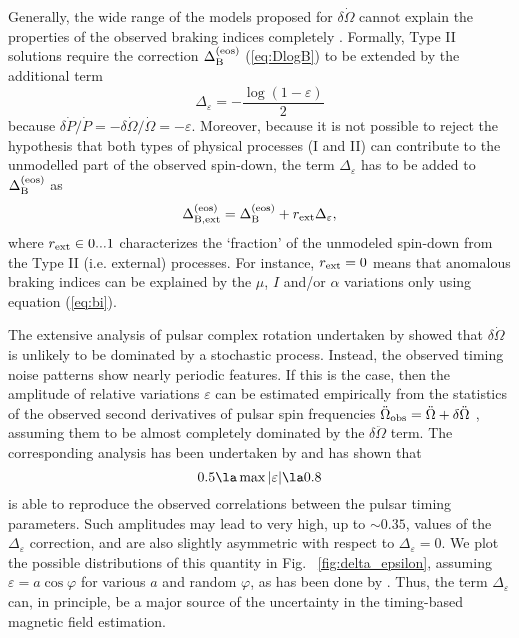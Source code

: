 \documentclass[fleqn,usenatbib]{mnras}
\begin{document}
Generally, the wide range of the models proposed for $\delta\dot\Omega$ cannot
explain the properties of the observed braking indices completely
 \citep{malov16}. Formally, Type II solutions require the correction
$\Delta^{\rm (eos)}_{\rm B}$ (\ref{eq:DlogB}) to be extended by the additional term
\begin{equation}
	\Delta_{\varepsilon} = -\dfrac{\log(1 - \varepsilon)}{2}
	\label{eq:delta_eps}
\end{equation}
because $\delta \dot P/\dot P = -\delta \dot \Omega/\dot \Omega = -\varepsilon$. 
Moreover, because it is not possible to reject the hypothesis that both types of physical processes
(I and II) can contribute to the unmodelled part of the observed
spin-down, the term $\Delta_{\varepsilon}$ has to be added to $\Delta^{\rm (eos)}_{\rm B}$ as
\begin{equation}
	\Delta^{\rm (eos)}_{\rm B,ext} = \Delta^{\rm (eos)}_{\rm B} + r_{\rm ext}\Delta_{\varepsilon},
	\label{eq:logBext}
\end{equation}
where $r_{\rm ext} \in 0...1$ characterizes the `fraction' of the unmodeled spin-down from the Type II (i.e. external)
processes.  For instance, $r_{\rm ext} = 0$ means that anomalous braking indices can be explained by the $\mu$, $I$ and/or $\alpha$
variations only using equation (\ref{eq:bi}).

The extensive analysis of pulsar complex rotation undertaken by
\cite{hobbs10} showed that $\delta\dot\Omega$ is unlikely to be dominated by a
stochastic process. Instead, the observed timing noise patterns show
nearly periodic features. If this is the case, then the amplitude of
relative variations $\varepsilon$ can be estimated empirically from the statistics
of the observed second derivatives of pulsar spin frequencies $\ddot \Omega_{\rm obs} = \ddot \Omega + \delta \ddot \Omega$ , assuming them to be almost completely dominated by
the $\delta\ddot\Omega$ term. The corresponding analysis has been undertaken by
\cite{bbk12} and has shown that
\begin{equation}
	0.5 \la \max \vert \varepsilon \vert \la 0.8
	\label{eq:epsilon_constr}
\end{equation}
is able to reproduce the observed correlations between the pulsar timing parameters. Such amplitudes may lead to very high, up
to $\sim 0.35$, values of the $\Delta_{\varepsilon}$ correction, and are also slightly asymmetric with respect to $\Delta_{\varepsilon} = 0$. We plot the possible distributions
of this quantity in Fig. ~\ref{fig:delta_epsilon}, assuming $\varepsilon = a\cos\varphi$ for various $a$ and
random $\varphi$, as has been done by \citet{bbk12}. Thus, the term $\Delta_{\varepsilon}$ can, in principle, be a major source of the uncertainty in
the timing-based magnetic field estimation.
\end{document}
